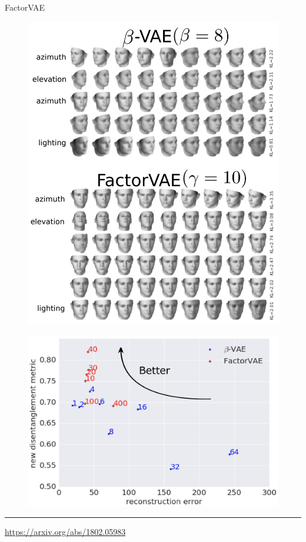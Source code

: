 \documentclass{beamer}
\begin{document}
\begin{frame}{FactorVAE}
	
	\begin{minipage}[t]{0.5\columnwidth}
		\begin{figure}
			\centering
			\includegraphics[width=\linewidth]{figs/factorvae_1}
		\end{figure}
	\end{minipage}%
	\begin{minipage}[t]{0.5\columnwidth}
		\vspace{1.7cm}
		\begin{figure}[h]
			\centering
			\includegraphics[width=\linewidth]{figs/factorvae_2}
		\end{figure}
	\end{minipage}
	
	\vfill
	\hrule\medskip
	{\scriptsize \href{https://arxiv.org/abs/1802.05983}{https://arxiv.org/abs/1802.05983}}
\end{frame}
\end{document}

